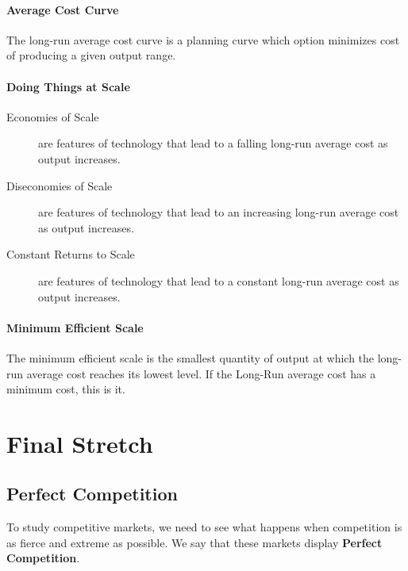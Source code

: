                 \subsection{Average Cost Curve} %
                \label{sub:average_cost_curve}
                    The long-run average cost curve is a planning curve which option minimizes cost of producing a given output range.
                \subsection{Doing Things at Scale} %
                \label{sub:doing_things_at_scale}
                    \begin{description}
                        \item[Economies of Scale] are features of technology that lead to a falling long-run average cost as output increases.
                        \item[Diseconomies of Scale] are features of technology that lead to an increasing long-run average cost as output increases.
                        \item[Constant Returns to Scale] are features of technology that lead to a constant long-run average cost as output increases.
                    \end{description}
                \subsection{Minimum Efficient Scale} %
                \label{sub:minimum_efficient_scale}
                    The minimum efficient scale is the smallest quantity of output at which the long-run average cost reaches its lowest level.
                    If the Long-Run average cost has a minimum cost, this is it.

    \part{Final Stretch} %
    \label{prt:final_ _stretch_}
        \chapter{Perfect Competition} %
        \label{cha:perfect_competition}
            To study competitive markets, we need to see what happens when competition is as fierce and extreme as possible.
            We say that these markets display \textbf{Perfect Competition}.

